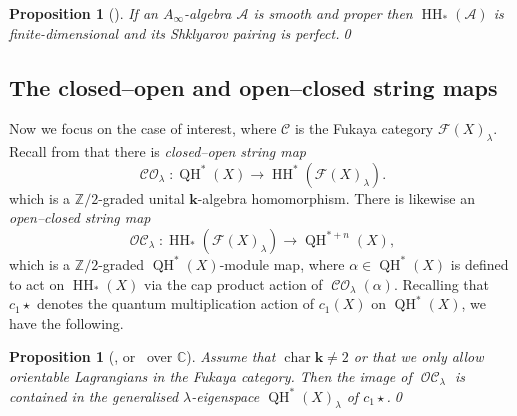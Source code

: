 \documentclass[JEP,XML,SOM,Unicode,NoEqCountersInSection,NoFloatCountersInSection,published]{cedram}
\newtheorem{proposition}[theorem]{Proposition}
\theoremstyle{definition}
\newcommand{\CC}{\mathbb{C}}
\newcommand{\ZZ}{\mathbb{Z}}
\newcommand{\calA}{\mathcal{A}}
\newcommand{\calC}{\mathcal{C}}
\newcommand{\Fuk}{\mathcal{F}}
\newcommand{\kk}{{\boldsymbol{k}}}
\newcommand{\Char}{\operatorname{char}}
\newcommand{\HH}{\operatorname{HH}}
\newcommand{\CO}{\operatorname{\mathcal{CO}}}
\newcommand{\OC}{\operatorname{\mathcal{OC}}}
\newcommand{\QH}{\operatorname{QH}}
\newcommand{\qprod}{\mathbin{\star}}
\begin{document}
\begin{proposition}[{\cite[Prop.\,5.24]{SheridanHodge}}]
\label{propSmoothProper}
If an $A_\infty$-algebra $\calA$ is smooth and proper then $\HH_*(\calA)$ is finite-dimensional and its Shklyarov pairing is perfect.\qed
\end{proposition}

\subsection{The closed--open and open--closed string maps}
\label{sscStringMaps}

Now we focus on the case of interest, where $\calC$ is the Fukaya category $\Fuk(X)_\lambda$. Recall from \cite[\S\S 2.5--2.6]{SheridanFano} that there is \emph{closed--open string map}
\[
\CO_\lambda : \QH^*(X) \to \HH^*(\Fuk(X)_\lambda).
\]
which is a $\ZZ/2$-graded unital $\kk$-algebra homomorphism. There is likewise an \emph{open--closed string map}
\[
\OC_\lambda : \HH_*(\Fuk(X)_\lambda) \to \QH^{*+n}(X),
\]
which is a $\ZZ/2$-graded $\QH^*(X)$-module map, where $\alpha \in \QH^*(X)$ is defined to act on $\HH_*(X)$ via the cap product action of $\CO_\lambda(\alpha)$. Recalling that $c_1 \qprod$ denotes the quantum multiplication action of $c_1(X)$ on $\QH^*(X)$, we have the following.

\begin{proposition}[{\cite[Th.\,9.5(1)]{RitterSmith}, or~\cite[Cor.\,2.11]{SheridanFano} over $\CC$}]
\label{propEspace}
Assume that $\Char \kk \neq 2$ or that we only allow orientable Lagrangians in the Fukaya category. Then the image of $\OC_\lambda$ is contained in the generalised $\lambda$-eigenspace $\QH^*(X)_\lambda$ of $c_1 \qprod$.\qed
\end{proposition}
\end{document}
